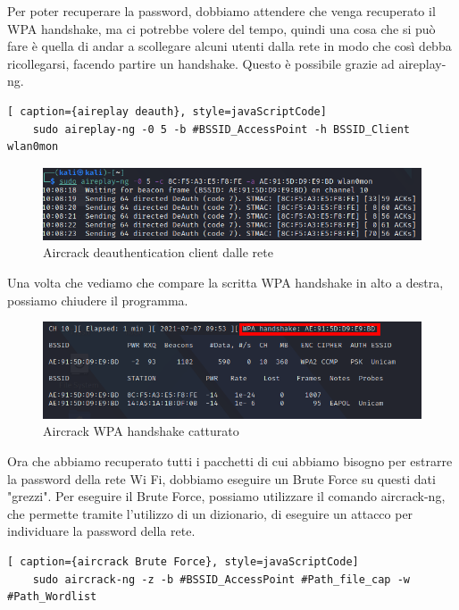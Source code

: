 Per poter recuperare la password, dobbiamo attendere che venga recuperato il WPA handshake, ma ci potrebbe volere del tempo, quindi una cosa che si può fare è quella di andar a scollegare alcuni utenti dalla rete in modo che così debba ricollegarsi, facendo partire un handshake. Questo è possibile grazie ad aireplay-ng.

\begin{lstlisting}[ caption={aireplay deauth}, style=javaScriptCode]
	sudo aireplay-ng -0 5 -b #BSSID_AccessPoint -h BSSID_Client wlan0mon
\end{lstlisting}

\begin{figure}[ht]
    \centering
    \includegraphics[width=\linewidth]{Immagini/6/aircrack_7.png}
    \caption{Aircrack deauthentication client dalle rete}
    \label{fig:Aircrack example}
\end{figure}

Una volta che vediamo che compare la scritta WPA handshake in alto a destra, possiamo chiudere il programma.

\begin{figure}[ht]
    \centering
    \includegraphics[width=\linewidth]{Immagini/6/aircrack_5.png}
    \caption{Aircrack WPA handshake catturato}
    \label{fig:Aircrack example}
\end{figure}

Ora che abbiamo recuperato tutti i pacchetti di cui abbiamo bisogno per estrarre la password della rete Wi Fi, dobbiamo eseguire un Brute Force su questi dati "grezzi". Per eseguire il Brute Force, possiamo utilizzare il comando aircrack-ng, che permette tramite l'utilizzo di un dizionario, di eseguire un attacco per individuare la password della rete.

\begin{lstlisting}[ caption={aircrack Brute Force}, style=javaScriptCode]
    sudo aircrack-ng -z -b #BSSID_AccessPoint #Path_file_cap -w #Path_Wordlist
\end{lstlisting}

